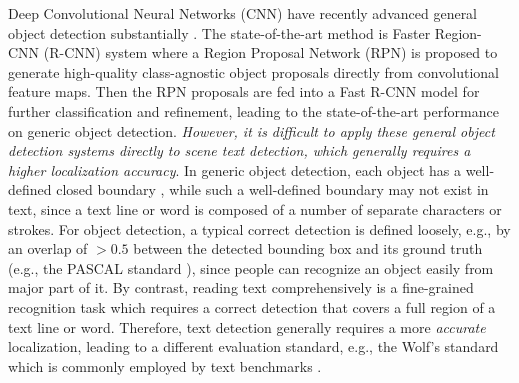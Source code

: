 \documentclass[runningheads]{llncs}
\begin{document}


Deep Convolutional Neural Networks (CNN) have recently advanced general object detection substantially \cite{Ren2015,Girshick2015,Girshick2014}. 
The state-of-the-art method is Faster Region-CNN (R-CNN) system \cite{Ren2015} where a Region Proposal Network (RPN) is proposed to  generate  high-quality class-agnostic object proposals directly from convolutional feature maps. Then the RPN proposals are fed into a Fast R-CNN \cite{Girshick2015} model for further classification and refinement, leading to the  state-of-the-art performance on generic object detection.
\textit{However, it is difficult to apply these general object detection systems directly to scene text detection, which generally requires a higher localization accuracy}.  
In generic object detection, each object has a well-defined closed boundary \cite{Cheng2014}, while such a well-defined boundary may not exist in text, since a text line or word is composed of a number of separate characters or strokes. For object detection, a typical correct detection is defined loosely, e.g., by an  overlap  of $>0.5$ between the detected bounding box and its ground truth (e.g., the PASCAL standard \cite{Everingham2010}), since people can recognize an object easily from major part of it.
By contrast, reading text comprehensively is a fine-grained recognition task which requires a correct detection that covers a full region of a text line or word. Therefore, text detection generally requires a more \textit{accurate} localization, leading to a different evaluation standard, e.g., the Wolf's standard \cite{Wolf2006} which is commonly employed by text  benchmarks \cite{Karatzas2013,Minetto2010}.   
\end{document}
